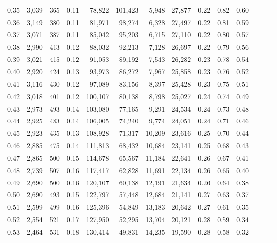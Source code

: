 \begin{tabular}{rrrrrrrrrrrrrr}
0.35 &  3,039 &  365 &  0.11 &   78,822 &  101,423 &   5,948 &  27,877 &  0.22 &  0.82 &      0.60 \\
0.36 &  3,149 &  380 &  0.11 &   81,971 &   98,274 &   6,328 &  27,497 &  0.22 &  0.81 &      0.59 \\
0.37 &  3,071 &  387 &  0.11 &   85,042 &   95,203 &   6,715 &  27,110 &  0.22 &  0.80 &      0.57 \\
0.38 &  2,990 &  413 &  0.12 &   88,032 &   92,213 &   7,128 &  26,697 &  0.22 &  0.79 &      0.56 \\
0.39 &  3,021 &  415 &  0.12 &   91,053 &   89,192 &   7,543 &  26,282 &  0.23 &  0.78 &      0.54 \\
0.40 &  2,920 &  424 &  0.13 &   93,973 &   86,272 &   7,967 &  25,858 &  0.23 &  0.76 &      0.52 \\
0.41 &  3,116 &  430 &  0.12 &   97,089 &   83,156 &   8,397 &  25,428 &  0.23 &  0.75 &      0.51 \\
0.42 &  3,018 &  401 &  0.12 &  100,107 &   80,138 &   8,798 &  25,027 &  0.24 &  0.74 &      0.49 \\
0.43 &  2,973 &  493 &  0.14 &  103,080 &   77,165 &   9,291 &  24,534 &  0.24 &  0.73 &      0.48 \\
0.44 &  2,925 &  483 &  0.14 &  106,005 &   74,240 &   9,774 &  24,051 &  0.24 &  0.71 &      0.46 \\
0.45 &  2,923 &  435 &  0.13 &  108,928 &   71,317 &  10,209 &  23,616 &  0.25 &  0.70 &      0.44 \\
0.46 &  2,885 &  475 &  0.14 &  111,813 &   68,432 &  10,684 &  23,141 &  0.25 &  0.68 &      0.43 \\
0.47 &  2,865 &  500 &  0.15 &  114,678 &   65,567 &  11,184 &  22,641 &  0.26 &  0.67 &      0.41 \\
0.48 &  2,739 &  507 &  0.16 &  117,417 &   62,828 &  11,691 &  22,134 &  0.26 &  0.65 &      0.40 \\
0.49 &  2,690 &  500 &  0.16 &  120,107 &   60,138 &  12,191 &  21,634 &  0.26 &  0.64 &      0.38 \\
0.50 &  2,690 &  493 &  0.15 &  122,797 &   57,448 &  12,684 &  21,141 &  0.27 &  0.63 &      0.37 \\
0.51 &  2,599 &  499 &  0.16 &  125,396 &   54,849 &  13,183 &  20,642 &  0.27 &  0.61 &      0.35 \\
0.52 &  2,554 &  521 &  0.17 &  127,950 &   52,295 &  13,704 &  20,121 &  0.28 &  0.59 &      0.34 \\
0.53 &  2,464 &  531 &  0.18 &  130,414 &   49,831 &  14,235 &  19,590 &  0.28 &  0.58 &      0.32 \\

\end{tabular}
